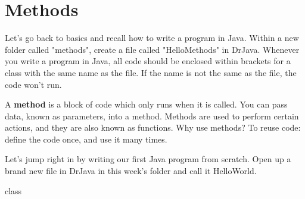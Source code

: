 \chapter{Methods}



Let's go back to basics and recall how to write a program in Java. Within a new folder called "methods", create a file called "HelloMethods" in DrJava. Whenever you write a program in Java, all code should be enclosed within brackets for a class with the same name as the file. If the name is not the same as the file, the code won't run. 

A \textbf{method} is a block of code which only runs when it is called. You can pass data, known as parameters, into a method. Methods are used to perform certain actions, and they are also known as functions. Why use methods? To reuse code: define the code once, and use it many times.

Let's jump right in by writing our first Java program from scratch. Open up a brand new file in DrJava in this week's folder and call it HelloWorld. 

\begin{code}
class 
\end{code}



